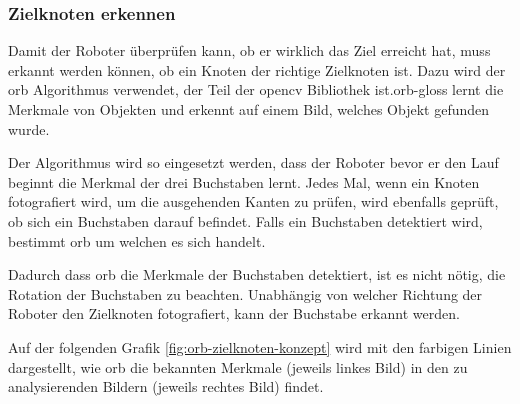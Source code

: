 \subsubsection{Zielknoten erkennen}

Damit der Roboter überprüfen kann, ob er wirklich das Ziel erreicht hat, muss erkannt werden können, ob ein Knoten der richtige Zielknoten ist. Dazu wird der \acrfull{orb} Algorithmus verwendet, der Teil der \gls{opencv} Bibliothek ist.\gls{orb-gloss} lernt die Merkmale von Objekten und erkennt auf einem Bild, welches Objekt gefunden wurde.

Der Algorithmus wird so eingesetzt werden, dass der Roboter bevor er den Lauf beginnt die Merkmal der drei Buchstaben lernt. Jedes Mal, wenn ein Knoten fotografiert wird, um die ausgehenden Kanten zu prüfen, wird ebenfalls geprüft, ob sich ein Buchstaben darauf befindet. Falls ein Buchstaben detektiert wird, bestimmt \acrshort{orb} um welchen es sich handelt.

Dadurch dass \acrshort{orb} die Merkmale der Buchstaben detektiert, ist es nicht nötig, die Rotation der Buchstaben zu beachten. Unabhängig von welcher Richtung der Roboter den Zielknoten fotografiert, kann der Buchstabe erkannt werden.

Auf der folgenden Grafik \ref{fig:orb-zielknoten-konzept} wird mit den farbigen Linien dargestellt, wie \acrshort{orb} die bekannten Merkmale (jeweils linkes Bild) in den zu analysierenden Bildern (jeweils rechtes Bild) findet.

